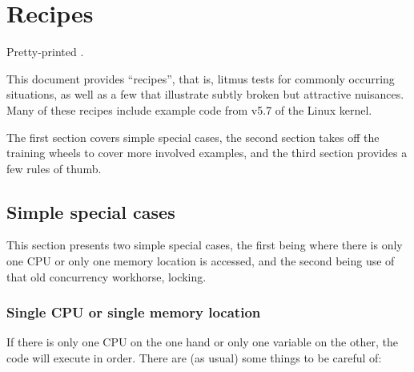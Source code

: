 \section{Recipes}
\label{sec:docs:Recipes}

\begin{Note}
  Pretty-printed .
\end{Note}

This document provides ``recipes'', that is, litmus tests for commonly
occurring situations, as well as a few that illustrate subtly broken but
attractive nuisances.
Many of these recipes include example code from v5.7 of the Linux kernel.

The first section covers simple special cases, the second section
takes off the training wheels to cover more involved examples,
and the third section provides a few rules of thumb.


\subsection{Simple special cases}

This section presents two simple special cases, the first being where
there is only one CPU or only one memory location is accessed, and the
second being use of that old concurrency workhorse, locking.


\subsubsection{Single CPU or single memory location}

If there is only one CPU on the one hand or only one variable
on the other, the code will execute in order.
There are (as usual) some things to be careful of:

